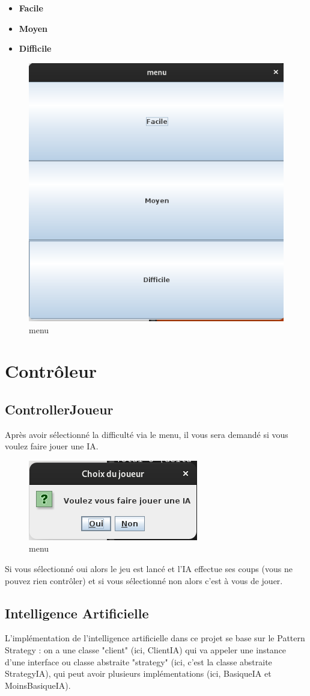 \documentclass[a4paper,12pt]{article} %
\begin{document}
\begin{itemize}
    \item \textbf{Facile}
    \item \textbf{Moyen}
    \item \textbf{Difficile}
\end{itemize}

\begin{figure}[ht]
    \centering
    \includegraphics[width=0.5\linewidth]{images/manu.png}
    \caption{menu}
\end{figure}


\section{Contrôleur}
\subsection{ControllerJoueur}
Après avoir sélectionné la difficulté via le menu, il vous sera demandé si vous voulez faire jouer une IA.

\begin{figure}[ht]
    \centering
    \includegraphics[width=0.5\linewidth]{images/choixJoueur.png}
    \caption{menu}
\end{figure}

Si vous sélectionné oui alors le jeu est lancé et l'IA effectue ses coups (vous ne pouvez rien contrôler) et si vous sélectionné non alors c'est à vous de jouer.

\subsection{Intelligence Artificielle}
\label{design IA}
L'implémentation de l'intelligence artificielle dans ce projet se base sur le Pattern Strategy : on a une classe "client" (ici, ClientIA) qui va appeler une instance d'une interface ou classe abstraite "strategy" (ici, c'est la classe abstraite StrategyIA), qui peut avoir plusieurs implémentations (ici, BasiqueIA et MoinsBasiqueIA).
\end{document}
